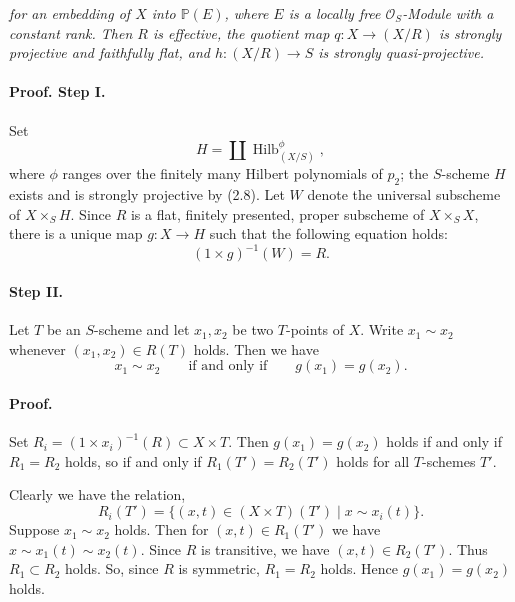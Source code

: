 

\DeclareMathOperator{\Hilb}{Hilb}


\textit{for an embedding of $X$ into $\mathbb P(E)$, where $E$ is a locally
free $\mathcal O_S$-Module with a constant rank. Then $R$ is effective, the
quotient map $q:X\to(X/R)$ is strongly projective and faithfully flat, and
$h:(X/R)\to S$ is strongly quasi-projective.}

\paragraph{Proof. Step I.}
Set
\[
H=\coprod\Hilb^{\phi}_{(X/S)},
\]
where $\phi$ ranges over the finitely many Hilbert polynomials of $p_2$; the
$S$-scheme $H$ exists and is strongly projective by (2.8). Let $W$ denote
the universal subscheme of $X\times_S H$. Since $R$ is a flat, finitely
presented, proper subscheme of $X\times_S X$, there is a unique map
$g:X\to H$ such that the following equation holds:
\[
(1\times g)^{-1}(W)=R. \tag{2.9.1}
\]

\paragraph{Step II.}
Let $T$ be an $S$-scheme and let $x_1,x_2$ be two $T$-points of $X$. Write
$x_1\sim x_2$ whenever $(x_1,x_2)\in R(T)$ holds. Then we have
\[
x_1\sim x_2\qquad\text{if and only if}\qquad g(x_1)=g(x_2).
\]

\paragraph{Proof.}
Set $R_i=(1\times x_i)^{-1}(R)\subset X\times T$. Then
$g(x_1)=g(x_2)$ holds if and only if $R_1=R_2$ holds, so if and only if
$R_1(T')=R_2(T')$ holds for all $T$-schemes $T'$.

Clearly we have the relation,
\[
R_i(T')=\{(x,t)\in(X\times T)(T')\mid x\sim x_i(t)\}.
\]
Suppose $x_1\sim x_2$ holds. Then for $(x,t)\in R_1(T')$ we have
$x\sim x_1(t)\sim x_2(t)$. Since $R$ is transitive, we have
$(x,t)\in R_2(T')$. Thus $R_1\subset R_2$ holds. So, since $R$ is
symmetric, $R_1=R_2$ holds. Hence $g(x_1)=g(x_2)$ holds.

